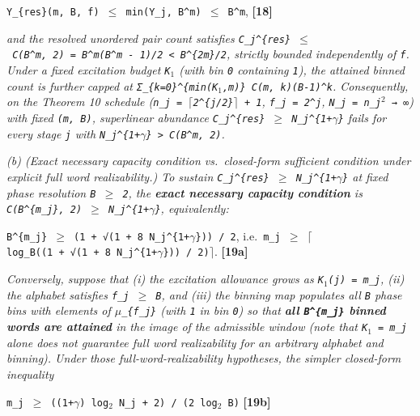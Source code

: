 \documentclass[
  american,
  11pt,
  letterpaper,
]{article}
\begin{document}
\texttt{\textbar{}Y\_\{res\}(m,\ B,\ f)\textbar{}\ \ensuremath{\leq}\ min(\textbar{}Y\_j\textbar{},\ B\^{}m)\ \ensuremath{\leq}\ B\^{}m}, \textbf{{[}18{]}}

\emph{and the resolved unordered pair count satisfies \texttt{C\_j\^{}\{res\}\ \ensuremath{\leq}\ C(B\^{}m,\ 2)\ =\ B\^{}m(B\^{}m\ -\ 1)/2\ \textless{}\ B\^{}\{2m\}/2}, strictly bounded independently of \texttt{f}. Under a fixed excitation budget \texttt{K\ensuremath{{}_{1}}} (with bin \texttt{0} containing \texttt{1}), the attained binned count is further capped at \texttt{Σ\_\{k=0\}\^{}\{min(K\ensuremath{{}_{1}},m)\}\ C(m,\ k)(B-1)\^{}k}. Consequently, on the Theorem 10 schedule (\texttt{n\_j\ =\ \ensuremath{\lceil}2\^{}\{j/2\}\ensuremath{\rceil}\ +\ 1}, \texttt{f\_j\ =\ 2\^{}j}, \texttt{N\_j\ =\ n\_j\ensuremath{{}^{2}}\ →\ ∞}) with fixed \texttt{(m,\ B)}, superlinear abundance \texttt{C\_j\^{}\{res\}\ \ensuremath{\geq}\ N\_j\^{}\{1+\ensuremath{\gamma}\}} fails for every stage \texttt{j} with \texttt{N\_j\^{}\{1+\ensuremath{\gamma}\}\ \textgreater{}\ C(B\^{}m,\ 2)}.}

\emph{(b) (Exact necessary capacity condition vs.~closed-form sufficient condition under explicit full word realizability.) To sustain \texttt{C\_j\^{}\{res\}\ \ensuremath{\geq}\ N\_j\^{}\{1+\ensuremath{\gamma}\}} at fixed phase resolution \texttt{B\ \ensuremath{\geq}\ 2}, the \textbf{exact necessary capacity condition} is \texttt{C(B\^{}\{m\_j\},\ 2)\ \ensuremath{\geq}\ N\_j\^{}\{1+\ensuremath{\gamma}\}}, equivalently:}

\texttt{B\^{}\{m\_j\}\ \ensuremath{\geq}\ (1\ +\ √(1\ +\ 8\ N\_j\^{}\{1+\ensuremath{\gamma}\}))\ /\ 2}, i.e.~\texttt{m\_j\ \ensuremath{\geq}\ \ensuremath{\lceil}log\_B((1\ +\ √(1\ +\ 8\ N\_j\^{}\{1+\ensuremath{\gamma}\}))\ /\ 2)\ensuremath{\rceil}}. \textbf{{[}19a{]}}

\emph{Conversely, suppose that (i) the excitation allowance grows as \texttt{K\ensuremath{{}_{1}}(j)\ =\ m\_j}, (ii) the alphabet satisfies \texttt{f\_j\ \ensuremath{\geq}\ B}, and (iii) the binning map populates all \texttt{B} phase bins with elements of \texttt{\ensuremath{\mu}\_\{f\_j\}} (with \texttt{1} in bin \texttt{0}) so that \textbf{all \texttt{B\^{}\{m\_j\}} binned words are attained} in the image of the admissible window (note that \texttt{K\ensuremath{{}_{1}}\ =\ m\_j} alone does not guarantee full word realizability for an arbitrary alphabet and binning). Under those full-word-realizability hypotheses, the simpler closed-form inequality}

\texttt{m\_j\ \ensuremath{\geq}\ ((1+\ensuremath{\gamma})\ log\ensuremath{{}_{2}}\ N\_j\ +\ 2)\ /\ (2\ log\ensuremath{{}_{2}}\ B)} \textbf{{[}19b{]}}
\end{document}
